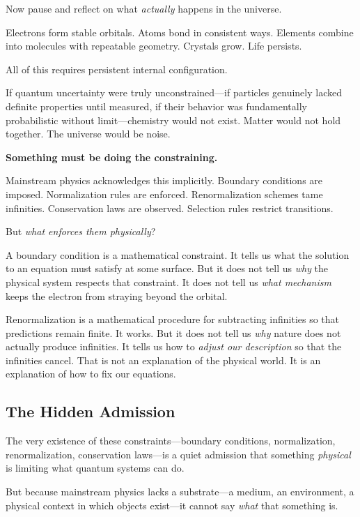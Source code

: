 \documentclass[12pt, a4paper]{article}
\begin{document}
Now pause and reflect on what \textit{actually} happens in the universe.

Electrons form stable orbitals. Atoms bond in consistent ways. Elements combine into molecules with repeatable geometry. Crystals grow. Life persists.

All of this requires persistent internal configuration.

If quantum uncertainty were truly unconstrained—if particles genuinely lacked definite properties until measured, if their behavior was fundamentally probabilistic without limit—chemistry would not exist. Matter would not hold together. The universe would be noise.

\textbf{Something must be doing the constraining.}

Mainstream physics acknowledges this implicitly. Boundary conditions are imposed. Normalization rules are enforced. Renormalization schemes tame infinities. Conservation laws are observed. Selection rules restrict transitions.

But \textit{what enforces them physically}?

A boundary condition is a mathematical constraint. It tells us what the solution to an equation must satisfy at some surface. But it does not tell us \textit{why} the physical system respects that constraint. It does not tell us \textit{what mechanism} keeps the electron from straying beyond the orbital.

Renormalization is a mathematical procedure for subtracting infinities so that predictions remain finite. It works. But it does not tell us \textit{why} nature does not actually produce infinities. It tells us how to \textit{adjust our description} so that the infinities cancel. That is not an explanation of the physical world. It is an explanation of how to fix our equations.

\subsection{The Hidden Admission}

The very existence of these constraints—boundary conditions, normalization, renormalization, conservation laws—is a quiet admission that something \textit{physical} is limiting what quantum systems can do.

But because mainstream physics lacks a substrate—a medium, an environment, a physical context in which objects exist—it cannot say \textit{what} that something is.
\end{document}
